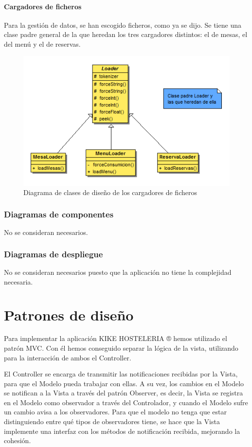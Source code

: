 \documentclass[spanish,a4paper,11pt, twoside]{report}	%
\begin{document}
		\subsection{Cargadores de ficheros}
		Para la gestión de datos, se han escogido ficheros, como ya se dijo. Se tiene una clase padre general de la que heredan los tres cargadores distintos: el de mesas, el del menú y el de reservas.
		\begin{figure}[!h]
		\centering
		\includegraphics[scale=0.5]{DCDloader.png}
		\caption{Diagrama de clases de diseño de los cargadores de ficheros}
		\end{figure}

	\section{Diagramas de componentes}
	No se consideran necesarios.

	\section{Diagramas de despliegue}
	No se consideran necesarios puesto que la aplicación no tiene la complejidad necesaria.





\setcounter{section}{0}
\part{Patrones de diseño}

Para implementar la aplicación KIKE  HOSTELERIA ® hemos utilizado el patrón MVC.
Con él hemos conseguido separar la lógica de la vista, utilizando para la interacción de ambos el Controller.

El Controller se encarga de transmitir las notificaciones recibidas por la Vista, para que el Modelo pueda trabajar con ellas. A su vez, los cambios en el Modelo se notifican a la Vista a través del patrón Observer, es decir, la Vista se registra en el Modelo como observador a través del Controlador, y cuando el Modelo sufre un cambio avisa a los observadores. Para que el modelo no tenga que estar distinguiendo entre qué tipos de observadores tiene, se hace que la Vista implemente una interfaz con los métodos de notificación recibida, mejorando la cohesión.
\end{document}
